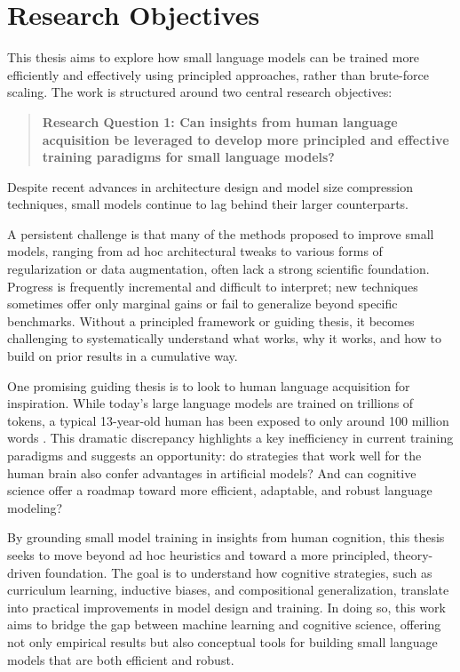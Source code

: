 
\section*{Research Objectives}

This thesis aims to explore how small language models can be trained more efficiently and effectively using principled approaches, rather than brute-force scaling. The work is structured around two central research objectives:

\begin{quote}
    \textbf{Research Question 1: Can insights from human language acquisition be leveraged to develop more principled and effective training paradigms for small language models?}
\end{quote}

Despite recent advances in architecture design and model size compression techniques, small models continue to lag behind their larger counterparts. 

A persistent challenge is that many of the methods proposed to improve small models, ranging from ad hoc architectural tweaks to various forms of regularization or data augmentation, often lack a strong scientific foundation. Progress is frequently incremental and difficult to interpret; new techniques sometimes offer only marginal gains or fail to generalize beyond specific benchmarks. Without a principled framework or guiding thesis, it becomes challenging to systematically understand what works, why it works, and how to build on prior results in a cumulative way.

One promising guiding thesis is to look to human language acquisition for inspiration. While today's large language models are trained on trillions of tokens, a typical 13-year-old human has been exposed to only around 100 million words \citep{warstadt2023babylm1}. This dramatic discrepancy highlights a key inefficiency in current training paradigms and suggests an opportunity: do strategies that work well for the human brain also confer advantages in artificial models? And can cognitive science offer a roadmap toward more efficient, adaptable, and robust language modeling?

By grounding small model training in insights from human cognition, this thesis seeks to move beyond ad hoc heuristics and toward a more principled, theory-driven foundation. The goal is to understand how cognitive strategies, such as curriculum learning, inductive biases, and compositional generalization, translate into practical improvements in model design and training. In doing so, this work aims to bridge the gap between machine learning and cognitive science, offering not only empirical results but also conceptual tools for building small language models that are both efficient and robust.

